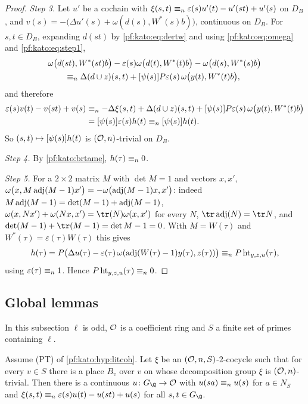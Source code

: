 \begin{proof}
\emph{Step 3.} Let $u'$ be a cochain with $\xi(s,t)\equiv_{n}\varepsilon(s)u'(t)-u'(st)+u'(s)$ on $D_B$, and
$v(s)=-\bigl(\Delta u'(s)+\omega(d(s),W^*(s)b)\bigr)$, continuous on $D_B$. For $s,t\in D_B$, expanding $d(st)$ by
\eqref{pf:kato:eq:dertw} and using \eqref{pf:kato:eq:omega} and \eqref{pf:kato:eq:step1},
\[
\begin{aligned}
  &\omega\bigl(d(st),W^*(st)b\bigr)-\varepsilon(s)\omega\bigl(d(t),W^*(t)b\bigr)-\omega\bigl(d(s),W^*(s)b\bigr)\\
  &\qquad\equiv_{n}\Delta(d\cup z)(s,t)+[\psi(s)]P\varepsilon(s)\,\omega\bigl(y(t),W^*(t)b\bigr),
\end{aligned}
\]
and therefore
\[
\begin{aligned}
  \varepsilon(s)v(t)-v(st)+v(s)&\equiv_{n}-\Delta\xi(s,t)+\Delta(d\cup z)(s,t)+[\psi(s)]P\varepsilon(s)\,\omega\bigl(y(t),W^*(t)b\bigr)\\
  &=[\psi(s)]\varepsilon(s)h(t)\equiv_{n}[\psi(s)]h(t).
\end{aligned}
\]
So $(s,t)\mapsto[\psi(s)]h(t)$ is $(\mathcal{O},n)$-trivial on $D_B$.

\emph{Step 4.} By \cref{pf:kato:brtame}, $h(\tau)\equiv_{n}0$.

\emph{Step 5.} For a $2\times2$ matrix $M$ with $\det M=1$ and vectors $x,x'$,
$\omega\bigl(x,M\operatorname{adj}(M-1)x'\bigr)=-\omega\bigl(\operatorname{adj}(M-1)x,x'\bigr)$: indeed $M\operatorname{adj}(M-1)=\det(M-1)+\operatorname{adj}(M-1)$,
$\omega(x,Nx')+\omega(Nx,x')=\tr(N)\omega(x,x')$ for every $N$, $\tr\katoadj(N)=\tr N$, and $\det(M-1)+\tr(M-1)=\det M-1=0$.
With $M=W(\tau)$ and $W^*(\tau)=\varepsilon(\tau)W(\tau)$ this gives
\[
  h(\tau)=P\bigl(\Delta u(\tau)-\varepsilon(\tau)\,\omega(\operatorname{adj}(W(\tau)-1)y(\tau),z(\tau))\bigr)
  \equiv_{n}P\,\mathrm{ht}_{y,z,u}(\tau),
\]
using $\varepsilon(\tau)\equiv_{n}1$. Hence $P\,\mathrm{ht}_{y,z,u}(\tau)\equiv_{n}0$.
\end{proof}

\subsection{Global lemmas}\label{pf:kato:sec:global}

In this subsection $\ell$ is odd, $\mathcal{O}$ is a coefficient ring and $S$ a finite set of primes containing $\ell$.

\begin{lemma}[Gluing]\label{pf:kato:glue}
Assume (PT) of \cref{pf:kato:hyp:litcoh}. Let $\xi$ be an $(\mathcal{O},n,S)$-$2$-cocycle such that for every $v\in S$ there is a
place $B_v$ over $v$ on whose decomposition group $\xi$ is $(\mathcal{O},n)$-trivial. Then there is a continuous
$u\colon G_\Q\to\katoO$ with $u(sa)\equiv_{n}u(s)$ for $a\in N_S$ and $\xi(s,t)\equiv_{n}\varepsilon(s)u(t)-u(st)+u(s)$ for all
$s,t\in G_\Q$.
\end{lemma}

